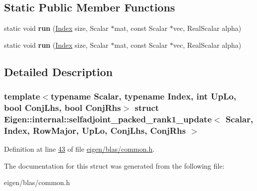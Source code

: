 \subsection*{Static Public Member Functions}
\begin{DoxyCompactItemize}
\item 
\mbox{\label{struct_eigen_1_1internal_1_1selfadjoint__packed__rank1__update_3_01_scalar_00_01_index_00_01_row44ee905dfbb7f4c0a9e13e624ea4a89c_af6885a2fdacef1469ecfaa3ebd86930c}} 
static void {\bfseries run} (\hyperlink{namespace_eigen_a62e77e0933482dafde8fe197d9a2cfde}{Index} size, Scalar $\ast$mat, const Scalar $\ast$vec, Real\+Scalar alpha)
\item 
\mbox{\label{struct_eigen_1_1internal_1_1selfadjoint__packed__rank1__update_3_01_scalar_00_01_index_00_01_row44ee905dfbb7f4c0a9e13e624ea4a89c_af6885a2fdacef1469ecfaa3ebd86930c}} 
static void {\bfseries run} (\hyperlink{namespace_eigen_a62e77e0933482dafde8fe197d9a2cfde}{Index} size, Scalar $\ast$mat, const Scalar $\ast$vec, Real\+Scalar alpha)
\end{DoxyCompactItemize}


\subsection{Detailed Description}
\subsubsection*{template$<$typename Scalar, typename Index, int Up\+Lo, bool Conj\+Lhs, bool Conj\+Rhs$>$\newline
struct Eigen\+::internal\+::selfadjoint\+\_\+packed\+\_\+rank1\+\_\+update$<$ Scalar, Index, Row\+Major, Up\+Lo, Conj\+Lhs, Conj\+Rhs $>$}



Definition at line \hyperlink{eigen_2blas_2common_8h_source_l00043}{43} of file \hyperlink{eigen_2blas_2common_8h_source}{eigen/blas/common.\+h}.



The documentation for this struct was generated from the following file\+:\begin{DoxyCompactItemize}
\item 
eigen/blas/common.\+h\end{DoxyCompactItemize}

